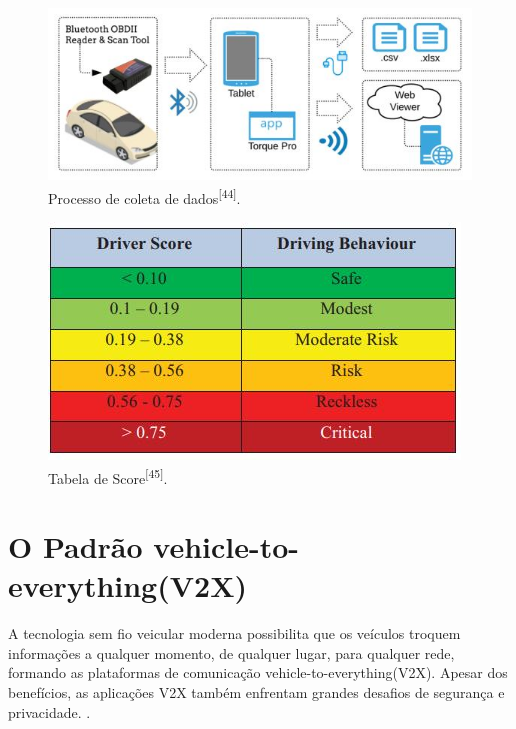 \begin{figure}[hp]
    \centering
    
    \includegraphics[]{figures/obd2_profiling.jpg}
    
    \caption{Processo de coleta de dados\textsuperscript{[44]}.}
    
    \label{fig:obd2_profiling}
\end{figure}

\begin{figure}[hp]
    \centering
    
    \includegraphics[]{figures/tabela_score.jpg}
    
    \caption{Tabela de Score\textsuperscript{[45]}.}
    
    \label{fig:tabela_score}
\end{figure}

\section{O Padrão vehicle-to-everything(V2X)}

A tecnologia sem fio veicular moderna possibilita que os veículos troquem informações a qualquer momento, de qualquer lugar, para qualquer rede, formando as plataformas de comunicação vehicle-to-everything(V2X). Apesar dos benefícios, as aplicações V2X também enfrentam grandes desafios de segurança e privacidade. \cite{M. Hasan, 2020}.

